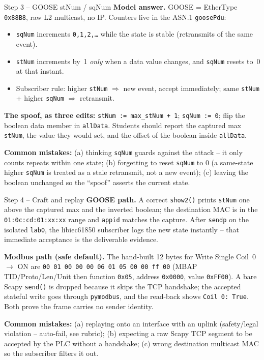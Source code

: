 \documentclass[11pt,a4paper]{article}
\begin{document}
\begin{solutionbox}{Step 3 -- GOOSE stNum / sqNum}
\textbf{Model answer.} GOOSE = EtherType \texttt{0x88B8}, raw L2 multicast,
no IP. Counters live in the ASN.1 \texttt{goosePdu}:
\begin{itemize}\setlength{\itemsep}{1pt}
  \item \texttt{sqNum} increments \texttt{0,1,2,\dots} while the state is
        stable (retransmits of the same event).
  \item \texttt{stNum} increments by~1 \emph{only} when a data value
        changes, and \texttt{sqNum} resets to~0 at that instant.
  \item Subscriber rule: higher \texttt{stNum} $\Rightarrow$ new event,
        accept immediately; same \texttt{stNum} + higher \texttt{sqNum}
        $\Rightarrow$ retransmit.
\end{itemize}
\textbf{The spoof, as three edits:} \texttt{stNum := max\_stNum + 1};
\texttt{sqNum := 0}; flip the boolean data member in \texttt{allData}.
Students should report the captured max \texttt{stNum}, the value they
would set, and the offset of the boolean inside \texttt{allData}.

\textbf{Common mistakes:} (a) thinking \texttt{sqNum} guards against the
attack -- it only counts repeats within one state; (b) forgetting to reset
\texttt{sqNum} to 0 (a same-state higher \texttt{sqNum} is treated as a
stale retransmit, not a new event); (c) leaving the boolean unchanged so
the ``spoof'' asserts the current state.
\end{solutionbox}

\begin{solutionbox}{Step 4 -- Craft and replay}
\textbf{GOOSE path.} A correct \texttt{show2()} prints \texttt{stNum} one
above the captured max and the inverted boolean; the destination MAC is in
the \texttt{01:0c:cd:01:xx:xx} range and \texttt{appid} matches the
capture. After \texttt{sendp} on the isolated \texttt{lab0}, the
libiec61850 subscriber logs the new state instantly -- that immediate
acceptance is the deliverable evidence.

\textbf{Modbus path (safe default).} The hand-built 12 bytes for Write
Single Coil~0 $\to$ ON are
\texttt{00 01 00 00 00 06 01 05 00 00 ff 00} (MBAP TID/Proto/Len/Unit
then function \texttt{0x05}, address \texttt{0x0000}, value \texttt{0xFF00}).
A bare Scapy \texttt{send()} is dropped because it skips the TCP
handshake; the accepted stateful write goes through \texttt{pymodbus}, and
the read-back shows \texttt{Coil 0: True}. Both prove the frame carries no
sender identity.

\textbf{Common mistakes:} (a) replaying onto an interface with an uplink
(safety/legal violation -- auto-fail, see rubric); (b) expecting a raw
Scapy TCP segment to be accepted by the PLC without a handshake;
(c) wrong destination multicast MAC so the subscriber filters it out.
\end{solutionbox}
\end{document}
